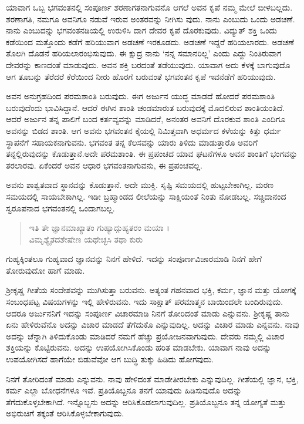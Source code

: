 ಯಾವಾಗ ಒಬ್ಬ ಭಗವಂತನಲ್ಲಿ ಸಂಪೂರ್ಣ ಶರಣಾಗತನಾಗುವನೊ ಆಗಲೆ ಅವನ ಕೃಪೆ ನಮ್ಮ ಮೇಲೆ ಬೀಳಬಲ್ಲದು. ಶರಣಾಗತಿ, ನಮಗೂ ಅವನಿಗೂ ನಡುವೆ ಇರುವ ಅಂತರವನ್ನು ನೀಗಿಸು ವುದು. ನಾನು ಎಂಬುದು ಒಂದು ಅಡಚಣೆ. ನಾನು ಎಂಬುದನ್ನು ಭಗವಂತನಡಿಯಲ್ಲಿ ಉರುಳಿಸಿ ದಾಗ ದೇವರ ಕೃಪೆ ದೊರಕುವುದು. ವಿದ್ಯುತ್ ಶಕ್ತಿ ಒಂದು ಕಡೆಯಿಂದ ಮತ್ತೊಂದು ಕಡೆಗೆ ಹರಿಯುವಾಗ ಅಡಚಣೆ ಇರಕೂಡದು. ಅಡಚಣೆ ಇದ್ದರೆ ಹರಿಯಲಾರದು. ಅಡಚಣೆ ತೊಲಗಿ ದೊಡನೆ ಹರಿಯಲಾರಂಭಿಸುವುದು. ಈ ಕ್ಷುದ್ರ ನಾನು ‘ನನ್ನ ಸಮಾನರಿಲ್ಲ’ ಎಂದು ಎದ್ದು ನಿಂತಿರುವಾಗ ದೇವರನ್ನು ಕಾಣದಂತೆ ಮಾಡುವುದು. ಅವನ ಶಕ್ತಿ ಬರದಂತೆ ತಡೆಯುವುದು. ಯಾವಾಗ ಅದು ಕೆಳಕ್ಕೆ ಬಾಗುವುದೊ ಆಗ ತೂಬನ್ನು ತೆರೆದರೆ ಕೆರೆಯಿಂದ ನೀರು ಹೊರಗೆ ಬರುವಂತೆ ಭಗವಂತನ ಕೃಪೆ ಇವನೆಡೆಗೆ ಹರಿಯುವುದು.

ಅವನ ಅನುಗ್ರಹದಿಂದ ಪರಮಶಾಂತಿ ಬರುವುದು. ಈಗ ಅರ್ಜುನ ಯುದ್ಧ ಮಾಡದೆ ಹೋದರೆ ಪರಮಶಾಂತಿ ಬರುವುದೆಂದು ಭಾವಿಸಿದ್ದಾನೆ. ಆದರೆ ಈಗಿನ ಶಾಂತಿ ಚಂಡಮಾರುತ ಬರುವುದಕ್ಕೆ ಮೊದಲಿರುವ ಶಾಂತಿಯಂತಿದೆ. ಆದರೆ ಅರ್ಜುನ ತನ್ನ ಪಾಲಿಗೆ ಬಂದ ಕರ್ತವ್ಯವನ್ನು ಮಾಡಿದರೆ, ಅನಂತರ ಅವನಿಗೆ ದೊರಕುವ ಶಾಂತಿ ಎಂದಿಗೂ ಅವನನ್ನು ಬಿಡದ ಶಾಂತಿ. ಆಗ ಅವನು ಭಗವಂತನ ಕೈಯಲ್ಲಿ ನಿಮಿತ್ತವಾಗಿ ಅಧರ್ಮದ ಕಳೆಯನ್ನು ಕಿತ್ತು ಧರ್ಮ ಸ್ಥಾಪನೆಗೆ ಸಹಾಯಕನಾಗುವನು. ಭಗವಂತ ತನ್ನ ಕೆಲಸವನ್ನು ಯಾರು ತಿಳಿದು ಮಾಡುತ್ತಾರೊ ಅವರಿಗೆ ತನ್ನಲ್ಲಿರುವುದನ್ನು ಕೊಡುತ್ತಾನೆ.ಅದೇ ಪರಮಶಾಂತಿ. ಈ ಪ್ರಪಂಚದ ಯಾವ ಘಟನೆಗಳೂ ಅವನ ಶಾಂತಿಗೆ ಭಂಗವನ್ನು ತರಲಾರವು. ಏಕೆಂದರೆ ಅವನ ಆಧಾರ ಭಗವಂತನಾಗುವನು, ಈ ಪ್ರಪಂಚವಲ್ಲ.

ಅವನು ಶಾಶ್ವತವಾದ ಸ್ಥಾನವನ್ನು ಕೊಡುತ್ತಾನೆ. ಅದೇ ಮುಕ್ತಿ. ಸೃಷ್ಟಿ ಸಮಯದಲ್ಲಿ ಹುಟ್ಟಬೇಕಾಗಿಲ್ಲ. ಮರಣ ಸಮಯದಲ್ಲಿ ಸಾಯಬೇಕಾಗಿಲ್ಲ. ಇಡೀ ಬ್ರಹ್ಮಾಂಡದ ಲೀಲೆಯನ್ನು ಸಾಕ್ಷಿಯಂತೆ ನಿಂತು ನೋಡಬಲ್ಲ. ಸಚ್ಚಿದಾನಂದ ಸ್ವರೂಪನಾದ ಭಗವಂತನಲ್ಲಿ ಒಂದಾಗಬಲ್ಲ.

\begin{verse}
ಇತಿ ತೇ ಜ್ಞಾನಮಾಖ್ಯಾತಂ ಗುಹ್ಯಾದ್ಗುಹ್ಯತರಂ ಮಯಾ ।\\ವಿಮೃಶ್ಯೈತದಶೇಷೇಣ ಯಥೇಚ್ಛಸಿ ತಥಾ ಕುರು 
\end{verse}

{\small ಗುಹ್ಯಕ್ಕಿಂತಲೂ ಗುಹ್ಯವಾದ ಜ್ಞಾನವನ್ನು ನಿನಗೆ ಹೇಳಿದೆ. ಇದನ್ನು ಸಂಪೂರ್ಣವಿಚಾರಮಾಡಿ ನಿನಗೆ ಹೇಗೆ ತೋರುವುದೋ ಹಾಗೆ ಮಾಡು.}

ಶ್ರೀಕೃಷ್ಣ ಗೀತೆಯ ಸಂದೇಶವನ್ನು ಮುಗಿಸುತ್ತಾ ಬರುವನು. ಅತ್ಯಂತ ಗಹನವಾದ ಭಕ್ತಿ, ಕರ್ಮ, ಜ್ಞಾನ ಮತ್ತು ಯೋಗಕ್ಕೆ ಸಂಬಂಧಪಟ್ಟ ವಿಷಯಗಳನ್ನು ಇಲ್ಲಿ ಹೇಳಿರುವನು. ಇದು ಸಾಕ್ಷಾತ್ ಪರಮಾತ್ಮನ ಬಾಯಿಂದಲೇ ಬಂದಿರುವುದು. ಆದರೂ ಅರ್ಜುನನಿಗೆ ಇದನ್ನು ಸಂಪೂರ್ಣ ವಿಚಾರಮಾಡಿ ನಿನಗೆ ತೋರಿದಂತೆ ಮಾಡು ಎನ್ನುವನು. ಶ್ರೀಕೃಷ್ಣ ತಾನು ಏನು ಹೇಳಿರುವೆನೊ ಅದನ್ನು ವಿಚಾರ ಮಾಡದೆ ತೆಗೆದುಕೊ ಎನ್ನುವುದಿಲ್ಲ. ಅದನ್ನು ವಿಚಾರ ಮಾಡು ಎನ್ನವನು. ನಾವು ಅದನ್ನು ಚೆನ್ನಾಗಿ ತಿಳಿದುಕೊಂಡು ಮಾಡಿದರೆ ನಮಗೆ ಹೆಚ್ಚು ಪ್ರಯೋಜನವಾಗುವುದು. ದೇವರು ನಮ್ಮಲ್ಲಿ ವಿಚಾರ ಶಕ್ತಿಯನ್ನು ಕೊಟ್ಟಿರುವನು. ಅದನ್ನು ಉಪಯೋಗಿಸಿಕೊಂಡು ಹರಿತ ಮಾಡಬೇಕು. ಯಾವಾಗ ನಾವು ಅದನ್ನು ಉಪಯೋಗಿಸದೆ ಹಾಗೆಯೇ ಬಿಡುವೆವೋ ಆಗ ಬುದ್ಧಿ ತುಕ್ಕು ಹಿಡಿದು ಹೋಗವುದು.

ನಿನಗೆ ತೋರಿದಂತೆ ಮಾಡು ಎನ್ನುವನು. ನಾವು ಹೇಳಿದಂತೆ ಮಾಡೇತೀರಬೇಕು ಎನ್ನುವುದಿಲ್ಲ. ಗೀತೆಯಲ್ಲಿ ಜ್ಞಾನ, ಭಕ್ತಿ, ಕರ್ಮ ಎಲ್ಲಾ ಬೋಧನೆಗಳೂ ಇವೆ. ಪ್ರತಿಯೊಬ್ಬನೂ ತನಗೆ ಯಾವುದು ಹಿಡಿಸುವುದೊ ಅದನ್ನು ತೆಗೆದುಕೊಳ್ಳಬೇಕಾಗಿದೆ. ಇನ್ನೊಬ್ಬನು ಅದನ್ನು ಆರಿಸಿಕೊಡಲಾಗುವುದಿಲ್ಲ. ಪ್ರತಿಯೊಬ್ಬನೂ ತನ್ನ ಯೋಗ್ಯತೆ ಮತ್ತು ಅಭಿರುಚಿಗೆ ತಕ್ಕಂತೆ ಆರಿಸಿಕೊಳ್ಳಬೇಕಾಗುವುದು.

